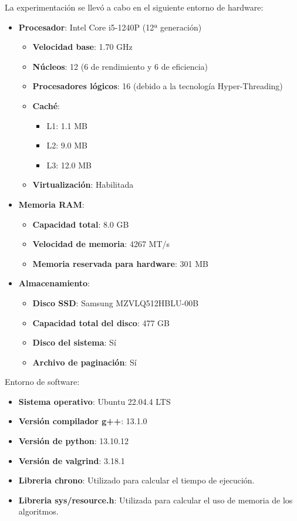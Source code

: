 La experimentación se llevó a cabo en el siguiente entorno de hardware:
\begin{itemize}
    \item \textbf{Procesador}: Intel Core i5-1240P (12ª generación)
    \begin{itemize}
        \item \textbf{Velocidad base}: 1.70 GHz
        \item \textbf{Núcleos}: 12 (6 de rendimiento y 6 de eficiencia)
        \item \textbf{Procesadores lógicos}: 16 (debido a la tecnología Hyper-Threading)
        \item \textbf{Caché}:
        \begin{itemize}
            \item L1: 1.1 MB
            \item L2: 9.0 MB
            \item L3: 12.0 MB
        \end{itemize}
        \item \textbf{Virtualización}: Habilitada
    \end{itemize}
    
    \item \textbf{Memoria RAM}:
    \begin{itemize}
        \item \textbf{Capacidad total}: 8.0 GB
        \item \textbf{Velocidad de memoria}: 4267 MT/s
        \item \textbf{Memoria reservada para hardware}: 301 MB
    \end{itemize}
    
    \item \textbf{Almacenamiento}:
    \begin{itemize}
        \item \textbf{Disco SSD}: Samsung MZVLQ512HBLU-00B
        \item \textbf{Capacidad total del disco}: 477 GB
        \item \textbf{Disco del sistema}: Sí
        \item \textbf{Archivo de paginación}: Sí
    \end{itemize}    
\end{itemize}

Entorno de software: 
\begin{itemize}
    \item \textbf{Sistema operativo}: Ubuntu 22.04.4 LTS
    \item \textbf{Versión compilador g++}: 13.1.0
    \item \textbf{Versión de python}: 13.10.12
    \item \textbf{Versión de valgrind}: 3.18.1
    \item \textbf{Libreria chrono}: Utilizado para calcular el tiempo de ejecución.
    \item \textbf{Libreria sys/resource.h}: Utilizada para calcular el uso de memoria de los algoritmos.
\end{itemize}
    